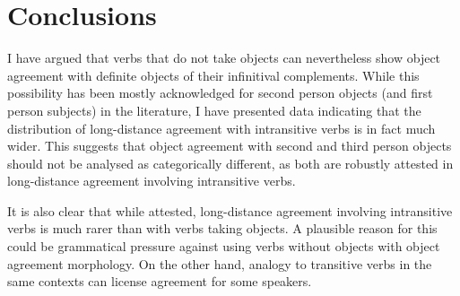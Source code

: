 %
%
%
%
%
%
%
%
%

\section{Conclusions}\label{sec:conclusions}

I have argued that verbs that do not take \Acc{} objects can nevertheless show
object agreement with definite \Acc{} objects of their infinitival complements.
While this possibility has been mostly acknowledged for second person objects
(and first person subjects) in the literature, I have presented data indicating
that the distribution of long-distance agreement with intransitive verbs is in
fact much wider.
%
This suggests that object agreement with second and third person objects should
not be analysed as categorically different, as both are robustly attested in
long-distance agreement involving intransitive verbs.

It is also clear that while attested, long-distance agreement involving
intransitive verbs is much rarer than with verbs taking \Acc{} objects. A
plausible reason for this could be grammatical pressure against using verbs
without \Acc{} objects with object agreement morphology. On the other hand,
analogy to transitive verbs in the same contexts can license agreement for some
speakers.

